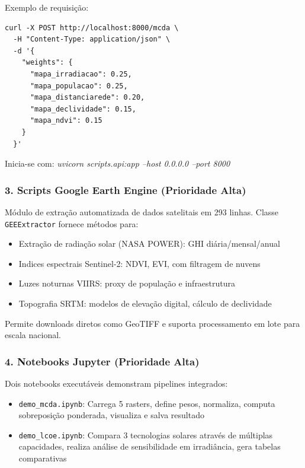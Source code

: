 \documentclass[12pt, a4paper]{article}
\begin{document}
\begin{itemize}
Exemplo de requisição:
\begin{verbatim}
curl -X POST http://localhost:8000/mcda \
  -H "Content-Type: application/json" \
  -d '{
    "weights": {
      "mapa_irradiacao": 0.25,
      "mapa_populacao": 0.25,
      "mapa_distanciarede": 0.20,
      "mapa_declividade": 0.15,
      "mapa_ndvi": 0.15
    }
  }'
\end{verbatim}

Inicia-se com: \textit{uvicorn scripts.api:app --host 0.0.0.0 --port 8000}

\subsubsection{3. Scripts Google Earth Engine (Prioridade Alta)}

Módulo de extração automatizada de dados satelitais em 293 linhas. Classe \texttt{GEEExtractor} fornece métodos para:

\begin{itemize}
    \item Extração de radiação solar (NASA POWER): GHI diária/mensal/anual
    \item Indices espectrais Sentinel-2: NDVI, EVI, com filtragem de nuvens
    \item Luzes noturnas VIIRS: proxy de população e infraestrutura
    \item Topografia SRTM: modelos de elevação digital, cálculo de declividade
\end{itemize}

Permite downloads diretos como GeoTIFF e suporta processamento em lote para escala nacional.

\subsubsection{4. Notebooks Jupyter (Prioridade Alta)}

Dois notebooks executáveis demonstram pipelines integrados:

\begin{itemize}
    \item \texttt{demo\_mcda.ipynb}: Carrega 5 rasters, define pesos, normaliza, computa sobreposição ponderada, visualiza e salva resultado
    \item \texttt{demo\_lcoe.ipynb}: Compara 3 tecnologias solares através de múltiplas capacidades, realiza análise de sensibilidade em irradiância, gera tabelas comparativas
\end{itemize}


\end{itemize}
\end{document}
